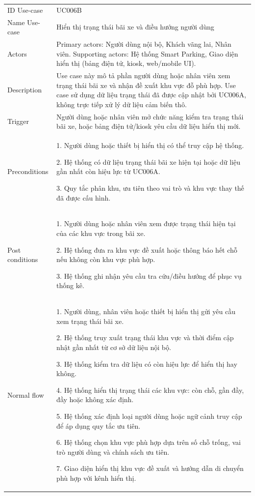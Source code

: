 \begin{center}
\begin{longtable}{|m{2.7cm}|m{12.8cm}|}
\hline
ID Use-case  & UC006B \\ 
Name Use-case & Hiển thị trạng thái bãi xe và điều hướng người dùng \\ 
\hline
Actors & Primary actors: Người dùng nội bộ, Khách vãng lai, Nhân viên. Supporting actors: Hệ thống Smart Parking, Giao diện hiển thị (bảng điện tử, kiosk, web/mobile UI).\\
\hline
Description & Use case này mô tả phần người dùng hoặc nhân viên xem trạng thái bãi xe và nhận đề xuất khu vực đỗ phù hợp. Use case sử dụng dữ liệu trạng thái đã được cập nhật bởi UC006A, không trực tiếp xử lý dữ liệu cảm biến thô.\\
\hline
Trigger & Người dùng hoặc nhân viên mở chức năng kiểm tra trạng thái bãi xe, hoặc bảng điện tử/kiosk yêu cầu dữ liệu hiển thị mới.\\
\hline
Preconditions & 
1. Người dùng hoặc thiết bị hiển thị có thể truy cập hệ thống.

2. Hệ thống có dữ liệu trạng thái bãi xe hiện tại hoặc dữ liệu gần nhất còn hiệu lực từ UC006A.

3. Quy tắc phân khu, ưu tiên theo vai trò và khu vực thay thế đã được cấu hình.\\
\hline
Post conditions & 
1. Người dùng hoặc nhân viên xem được trạng thái hiện tại của các khu vực trong bãi xe.

2. Hệ thống đưa ra khu vực đề xuất hoặc thông báo hết chỗ nếu không còn khu vực phù hợp.

3. Hệ thống ghi nhận yêu cầu tra cứu/điều hướng để phục vụ thống kê.\\
\hline
Normal flow & 
1. Người dùng, nhân viên hoặc thiết bị hiển thị gửi yêu cầu xem trạng thái bãi xe.

2. Hệ thống truy xuất trạng thái khu vực và thời điểm cập nhật gần nhất từ cơ sở dữ liệu nội bộ.

3. Hệ thống kiểm tra dữ liệu có còn hiệu lực để hiển thị hay không.

4. Hệ thống hiển thị trạng thái các khu vực: còn chỗ, gần đầy, đầy hoặc không xác định.

5. Hệ thống xác định loại người dùng hoặc ngữ cảnh truy cập để áp dụng quy tắc ưu tiên.

6. Hệ thống chọn khu vực phù hợp dựa trên số chỗ trống, vai trò người dùng và chính sách ưu tiên.

7. Giao diện hiển thị khu vực đề xuất và hướng dẫn di chuyển phù hợp với kênh hiển thị.


\end{longtable}
\end{center}
